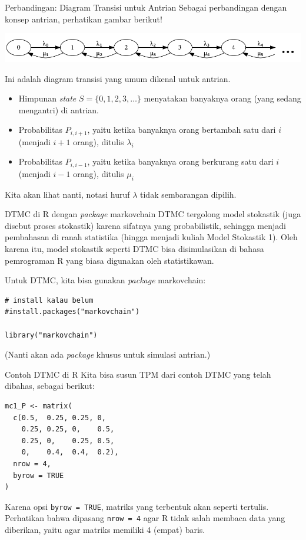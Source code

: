\documentclass{beamer}
\begin{document}
\begin{frame}{Perbandingan: Diagram Transisi untuk Antrian}
    Sebagai perbandingan dengan konsep antrian, perhatikan gambar berikut!

    \includegraphics[scale=0.5]{gambar/diagram_transisi_antrian.png}

    Ini adalah diagram transisi yang umum dikenal untuk antrian.
    \begin{itemize}
        \item Himpunan \textit{state} \( S = \{ 0, 1, 2, 3, \dots \} \) menyatakan banyaknya orang (yang sedang mengantri) di antrian.
        \item Probabilitas \( P_{i,i+1} \), yaitu ketika banyaknya orang bertambah satu dari \( i \) (menjadi \( i+1 \) orang), ditulis \( \lambda_i \)
        \item Probabilitas \( P_{i,i-1} \), yaitu ketika banyaknya orang berkurang satu dari \( i \) (menjadi \( i-1 \) orang), ditulis \( \mu_i \)
    \end{itemize}
    Kita akan lihat nanti, notasi huruf \( \lambda \) tidak sembarangan dipilih.
\end{frame}

\begin{frame}[fragile]{DTMC di R dengan \textit{package} markovchain}
    DTMC tergolong model stokastik (juga disebut proses stokastik) karena sifatnya yang probabilistik, sehingga menjadi pembahasan di ranah statistika (hingga menjadi kuliah Model Stokastik 1). Oleh karena itu, model stokastik seperti DTMC bisa disimulasikan di bahasa pemrograman R yang biasa digunakan oleh statistikawan. 
    
    Untuk DTMC, kita bisa gunakan \textit{package} markovchain:

\begin{verbatim}
# install kalau belum
#install.packages("markovchain")

library("markovchain")
\end{verbatim}

    (Nanti akan ada \textit{package} khusus untuk simulasi antrian.)
\end{frame}

\begin{frame}[fragile]{Contoh DTMC di R}
    Kita bisa susun TPM dari contoh DTMC yang telah dibahas, sebagai berikut:

\begin{verbatim}
mc1_P <- matrix(
  c(0.5,  0.25, 0.25, 0,
    0.25, 0.25, 0,    0.5,
    0.25, 0,    0.25, 0.5,
    0,    0.4,  0.4,  0.2),
  nrow = 4,
  byrow = TRUE
)
\end{verbatim}

Karena opsi \verb|byrow = TRUE|, matriks yang terbentuk akan seperti tertulis. Perhatikan bahwa dipasang \verb|nrow = 4| agar R tidak salah membaca data yang diberikan, yaitu agar matriks memiliki 4 (empat) baris.
\end{frame}
\end{document}
